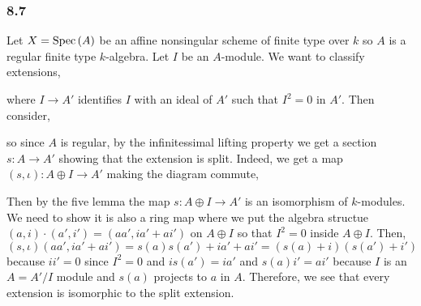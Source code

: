 \documentclass[12pt]{article}
\begin{document}
\subsubsection{8.7}

Let $X = \mathrm{Spec}\left( A \right)$ be an affine nonsingular scheme of finite type over $k$ so $A$ is a regular finite type $k$-algebra. Let $I$ be an $A$-module. We want to classify extensions,
\begin{center}
\end{center}
where $I \to A'$ identifies $I$ with an ideal of $A'$ such that $I^2 = 0$ in $A'$. Then consider,
\begin{center}
\end{center}
so since $A$ is regular, by the infinitessimal lifting property we get a section $s : A \to A'$ showing that the extension is split. Indeed, we get a map $(s, \iota) : A \oplus I \to A'$ making the diagram commute,
\begin{center}
\end{center}
Then by the five lemma the map $s : A \oplus I \to A'$ is an isomorphism of $k$-modules. We need to show it is also a ring map where we put the algebra structue $(a,i) \cdot (a', i') = (aa', i a' + a i')$ on $A \oplus I$ so that $I^2 = 0$ inside $A \oplus I$. Then,
\[ (s, \iota)(aa', i a' + a i') = s(a)s(a') + i a' + a i' = (s(a) + i)(s(a') + i') \]
because $i i' = 0$ since $I^2 = 0$ and $i s(a') = i a'$ and $s(a) i' = a i'$ because $I$ is an $A = A'/I$ module and $s(a)$ projects to $a$ in $A$. Therefore, we see that every extension is isomorphic to the split extension.
\end{document}
